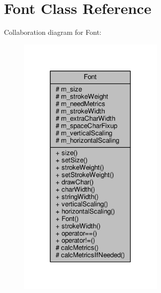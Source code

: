\hypertarget{classFont}{}\section{Font Class Reference}
\label{classFont}


Collaboration diagram for Font\+:
\nopagebreak
\begin{figure}[H]
\begin{center}
\leavevmode
\includegraphics[width=201pt]{d2/d28/classFont__coll__graph}
\end{center}
\end{figure}

